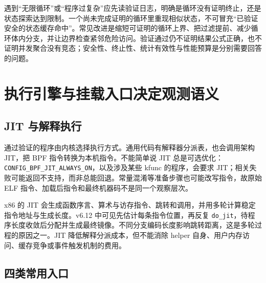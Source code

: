 \documentclass[UTF8,fontset=fandol,openany,11pt]{ctexbook}
\begin{document}
遇到“无限循环”或“程序过复杂”应先读验证日志，明确是循环没有证明终止，还是状态探索达到限制。一个尚未完成证明的循环里重现相似状态，不可冒充“已验证安全的状态缓存命中”。常见改进是缩短可证明的循环上界、把过滤提前、减少循环体内分支，并让边界检查紧邻危险访问。验证通过仍不证明结果公式正确，也不证明并发聚合没有竞态；安全性、终止性、统计有效性与性能预算是分别需要回答的问题。\cite{eb-verifier-code}


\section{执行引擎与挂载入口决定观测语义}

\subsection{JIT 与解释执行}

通过验证的程序由内核选择执行方式。通用代码有解释器分派表，也会调用架构 JIT，把 BPF 指令转换为本机指令。不能简单说 JIT 总是可选优化：\texttt{CONFIG\_\allowbreak{}BPF\_\allowbreak{}JIT\_\allowbreak{}ALWAYS\_\allowbreak{}ON}，以及涉及某些 kfunc 的程序，会要求 JIT；相关失败可能返回不支持，而非总能回退。常量混淆等准备步骤也可能改写指令，故原始 ELF 指令、加载后指令和最终机器码不是同一个观察层次。\cite{eb-runtime-select}


x86 的 JIT 会生成函数序言、算术与访存指令、跳转和调用，并用多轮计算稳定指令地址与生成长度。v6.12 中可见先估计每条指令位置，再反复 \texttt{do\_\allowbreak{}jit}，待程序长度收敛后分配并生成最终镜像。不同分支编码长度影响跳转距离，这是多轮过程的原因之一。JIT 降低解释分派成本，但不能消除 helper 自身、用户内存访问、缓存竞争或事件触发机制的费用。\cite{eb-x86-jit}\cite{eb-ring-code}


\subsection{四类常用入口}
\end{document}
